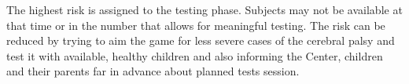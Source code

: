 \documentclass[10pt,a4paper]{article}
\begin{document}
The highest risk is assigned to the testing phase. Subjects may not be available at that time or in the number that allows for meaningful testing. The risk can be reduced by trying to aim the game for less severe cases of the cerebral palsy and test it with available, healthy children and also informing the Center, children and their parents far in advance about planned tests session.
\end{document}
